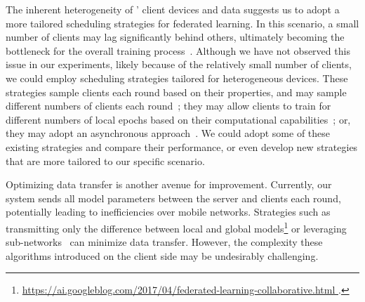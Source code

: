 The inherent heterogeneity of \fedcampus' client devices and data suggests us to
adopt a more tailored scheduling strategies for federated learning.
In this scenario, a small number of clients may lag significantly behind others,
ultimately becoming the bottleneck for the overall training
process~\cite{chen2020asynchronous,zheng2017asynchronous}.
Although we have not observed this issue in our experiments,
likely because of the relatively small number of clients,
we could employ scheduling strategies tailored for heterogeneous devices.
These strategies sample clients each round based on their properties,
and may sample different numbers of clients each
round~\cite[e.g.,][]{zhang2022fedada,karimireddy2019error,reddi2020adaptive,luo2021cost};
they may allow clients to train for different numbers of local epochs based on
their computational capabilities~\cite{li2020federated}; or,
they may adopt an asynchronous
approach~\cite{chilimbi2014project,zhu2022online,huba2022papaya,sun2022fedsea}.
We could adopt some of these existing strategies and compare their performance,
or even develop new strategies that are more tailored to our specific scenario.

Optimizing data transfer is another avenue for improvement. Currently,
our system sends all model parameters between the server and clients each round,
potentially leading to inefficiencies over mobile networks.
Strategies such as transmitting only the difference between local and global
models\footnote{\url{
        https://ai.googleblog.com/2017/04/federated-learning-collaborative.html
    }.} or leveraging sub-networks~\cite{li2021hermes}
    can minimize data transfer.
However,
the complexity these algorithms introduced on the client side may be undesirably
challenging.
